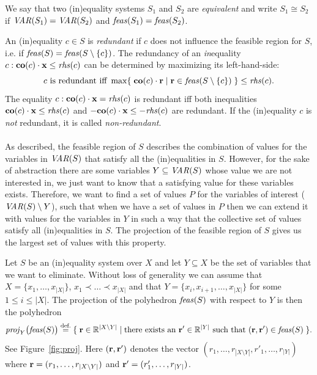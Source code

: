{We say that two (in)equality systems $S_1$ and $S_2$ are \emph{equivalent} and write $S_1\cong S_2$ if 
$\mathit{VAR}(S_1)=\mathit{VAR}(S_2)$ and $\mathit{feas}(S_1) = \mathit{feas}(S_2)$.}

An (in)equality $c\in S$ is \emph{redundant} if $c$ does not influence the feasible region for $S$, i.e. if $\mathit{feas}(S)=\mathit{feas}(S\setminus\{c\})$. The redundancy of an \emph{in}equality $c: \mathbf{co}(c)\cdot\mathbf{x}\leq \mathit{rhs}(c)$ can be determined by maximizing its left-hand-side:  
\begin{equation}\label{eq:redundant}
c \text{ is redundant iff }\max\{\;{\mathbf{co}(c)\cdot\mathbf{r}}\;|\;{\mathbf{r}\in \mathit{feas}(S\setminus\{c\})}\;\} \leq \mathit{rhs}(c).
\end{equation}
The equality $c: \mathbf{co}(c)\cdot\mathbf{x} = \mathit{rhs}(c)$ 
is redundant iff both inequalities 
$\mathbf{co}(c)\cdot\mathbf{x} \leq \mathit{rhs}(c)$ and $-\mathbf{co}(c)\cdot\mathbf{x} \leq -\mathit{rhs}(c)$ 
are redundant.
If the (in)equality $c$ is \emph{not} redundant, it is called \emph{non-redundant}.
%
\\\\
%
As described, the feasible region of $S$ describes the combination of values for the variables in $\mathit{VAR}(S)$ that satisfy all the (in)equalities in $S$. However, for the sake of abstraction there are some variables $Y\subseteq \mathit{VAR}(S)$ whose value we are not interested in, we just want to know that a satisfying value for these variables exists.  
Therefore, we want to find a set of values $P$ for the variables of interest ($\mathit{VAR}(S)\setminus Y$), such that when we have a set of values in $P$ then we can extend it with values for the variables in $Y$ in such a way that the collective set of values satisfy all (in)equalities in $S$. 
The {projection} of the feasible region of $S$ gives us the largest set of values with this property.

Let $S$ be an (in)equality system over $X$ and let $Y\subseteq X$ be the set of variables that we want to eliminate. Without loss of generality we can assume that $X = \{x_1,\ldots, x_{|X|}\}$, $x_1\prec \ldots \prec x_{|X|}$ and that $Y=\{x_i, x_{i+1}, \ldots, x_{|X|}\}$ for some $1\leq i\leq |X|$.
The {projection} of the polyhedron $\mathit{feas}(S)$ with respect to $Y$ is then the polyhedron 
\[
\mathit{proj}_Y\big(\mathit{feas}(S)\big) \overset{\text{def.}}= \{\;{\mathbf{r}\in\mathbb{R}^{|X\setminus Y|}}\;|\;{\text{there exists an } \mathbf{r}'\in\mathbb{R}^{|Y|}\text{ such that }
(\mathbf{r},\mathbf{r'})\in \mathit{feas}(S)}\;\}.
\]
See Figure~\ref{fig:proj}. Here $(\mathbf{r},\mathbf{r'})$ denotes the vector $(r_1,\ldots, r_{|X\setminus Y|}, r'_1,\ldots, r_{|Y|})$ where $\mathbf{r}=(r_1,\ldots, r_{|X\setminus Y|})$ and $\mathbf{r'}=(r'_1,\ldots, r_{|Y|})$.

